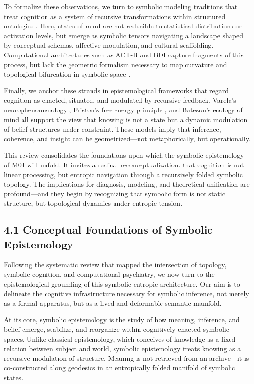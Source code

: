To formalize these observations, we turn to symbolic modeling traditions that treat cognition as a system of recursive transformations within structured ontologies \cite{fodor1975language, piaget1970genetic}. Here, states of mind are not reducible to statistical distributions or activation levels, but emerge as symbolic tensors navigating a landscape shaped by conceptual schemas, affective modulation, and cultural scaffolding. Computational architectures such as ACT-R and BDI capture fragments of this process, but lack the geometric formalism necessary to map curvature and topological bifurcation in symbolic space \cite{anderson1996actr, rao1995bdi}.

Finally, we anchor these strands in epistemological frameworks that regard cognition as enacted, situated, and modulated by recursive feedback. Varela’s neurophenomenology \cite{varela1996neurophenomenology}, Friston’s free energy principle \cite{friston2010free}, and Bateson’s ecology of mind \cite{bateson1979mind} all support the view that knowing is not a state but a dynamic modulation of belief structures under constraint. These models imply that inference, coherence, and insight can be geometrized—not metaphorically, but operationally.

This review consolidates the foundations upon which the symbolic epistemology of M04 will unfold. It invites a radical reconceptualization: that cognition is not linear processing, but entropic navigation through a recursively folded symbolic topology. The implications for diagnosis, modeling, and theoretical unification are profound—and they begin by recognizing that symbolic form is not static structure, but topological dynamics under entropic tension.

\subsection*{4.1 Conceptual Foundations of Symbolic Epistemology}

Following the systematic review that mapped the intersection of topology, symbolic cognition, and computational psychiatry, we now turn to the epistemological grounding of this symbolic-entropic architecture. Our aim is to delineate the cognitive infrastructure necessary for symbolic inference, not merely as a formal apparatus, but as a lived and deformable semantic manifold.

At its core, symbolic epistemology is the study of how meaning, inference, and belief emerge, stabilize, and reorganize within cognitively enacted symbolic spaces. Unlike classical epistemology, which conceives of knowledge as a fixed relation between subject and world, symbolic epistemology treats knowing as a recursive modulation of structure. Meaning is not retrieved from an archive—it is co-constructed along geodesics in an entropically folded manifold of symbolic states.

